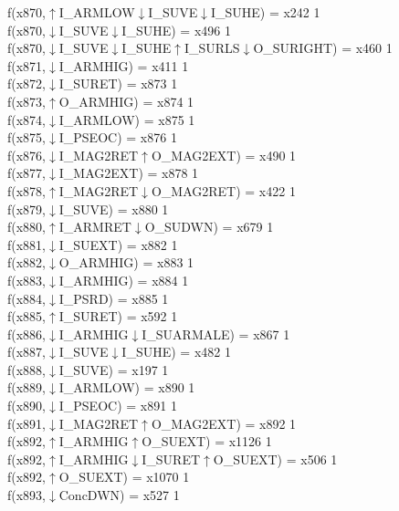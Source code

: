 f(x870,$\uparrow$I\_ARMLOW$\downarrow$I\_SUVE$\downarrow$I\_SUHE) = x242 {1} \\
f(x870,$\downarrow$I\_SUVE$\downarrow$I\_SUHE) = x496 {1} \\
f(x870,$\downarrow$I\_SUVE$\downarrow$I\_SUHE$\uparrow$I\_SURLS$\downarrow$O\_SURIGHT) = x460 {1} \\
f(x871,$\downarrow$I\_ARMHIG) = x411 {1} \\
f(x872,$\downarrow$I\_SURET) = x873 {1} \\
f(x873,$\uparrow$O\_ARMHIG) = x874 {1} \\
f(x874,$\downarrow$I\_ARMLOW) = x875 {1} \\
f(x875,$\downarrow$I\_PSEOC) = x876 {1} \\
f(x876,$\downarrow$I\_MAG2RET$\uparrow$O\_MAG2EXT) = x490 {1} \\
f(x877,$\downarrow$I\_MAG2EXT) = x878 {1} \\
f(x878,$\uparrow$I\_MAG2RET$\downarrow$O\_MAG2RET) = x422 {1} \\
f(x879,$\downarrow$I\_SUVE) = x880 {1} \\
f(x880,$\uparrow$I\_ARMRET$\downarrow$O\_SUDWN) = x679 {1} \\
f(x881,$\downarrow$I\_SUEXT) = x882 {1} \\
f(x882,$\downarrow$O\_ARMHIG) = x883 {1} \\
f(x883,$\downarrow$I\_ARMHIG) = x884 {1} \\
f(x884,$\downarrow$I\_PSRD) = x885 {1} \\
f(x885,$\uparrow$I\_SURET) = x592 {1} \\
f(x886,$\downarrow$I\_ARMHIG$\downarrow$I\_SUARMALE) = x867 {1} \\
f(x887,$\downarrow$I\_SUVE$\downarrow$I\_SUHE) = x482 {1} \\
f(x888,$\downarrow$I\_SUVE) = x197 {1} \\
f(x889,$\downarrow$I\_ARMLOW) = x890 {1} \\
f(x890,$\downarrow$I\_PSEOC) = x891 {1} \\
f(x891,$\downarrow$I\_MAG2RET$\uparrow$O\_MAG2EXT) = x892 {1} \\
f(x892,$\uparrow$I\_ARMHIG$\uparrow$O\_SUEXT) = x1126 {1} \\
f(x892,$\uparrow$I\_ARMHIG$\downarrow$I\_SURET$\uparrow$O\_SUEXT) = x506 {1} \\
f(x892,$\uparrow$O\_SUEXT) = x1070 {1} \\
f(x893,$\downarrow$ConcDWN) = x527 {1} \\
